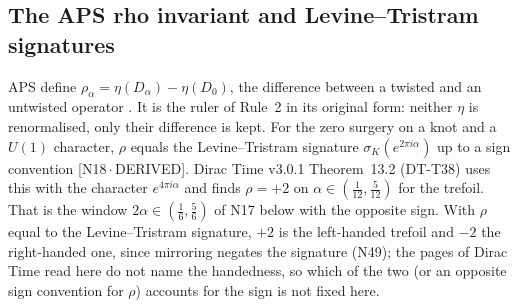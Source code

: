 \documentclass[11pt]{article}
\theoremstyle{definition}
\newcommand{\dtag}[1]{#1}
\begin{document}
\subsection{The APS rho invariant and Levine--Tristram signatures}
APS define $\rho_\alpha=\eta(D_\alpha)-\eta(D_0)$, the difference between a twisted and an untwisted operator \cite{APS2}. It is the ruler of Rule~2 in its original form: neither $\eta$ is renormalised, only their difference is kept. For the zero surgery on a knot and a $U(1)$ character, $\rho$ equals the Levine--Tristram signature $\sigma_K(e^{2\pi i\alpha})$ up to a sign convention \dtag{\textsf{\small[N18\,$\cdot$\,DERIVED]}}. Dirac Time v3.0.1 Theorem~13.2 (DT-T38) uses this with the character $e^{4\pi i\alpha}$ and finds $\rho=+2$ on $\alpha\in(\tfrac1{12},\tfrac5{12})$ for the trefoil. That is the window $2\alpha\in(\tfrac16,\tfrac56)$ of N17 below with the opposite sign. With $\rho$ equal to the Levine--Tristram signature, $+2$ is the left-handed trefoil and $-2$ the right-handed one, since mirroring negates the signature (N49); the pages of Dirac Time read here do not name the handedness, so which of the two (or an opposite sign convention for $\rho$) accounts for the sign is not fixed here.
\end{document}
